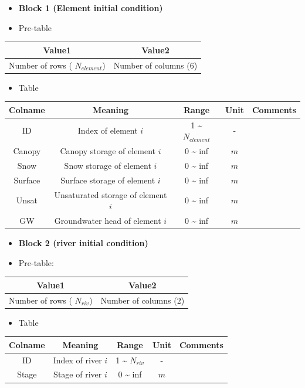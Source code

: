 \documentclass[]{scrbook}
\providecommand{\tightlist}{%
  \setlength{\itemsep}{0pt}\setlength{\parskip}{0pt}}
\begin{document}
\begin{itemize}
\item
  \textbf{Block 1 (Element initial condition)}
\item
  Pre-table
\end{itemize}

\begin{longtable}[]{@{}cc@{}}
\toprule
Value1 & Value2\tabularnewline
\midrule
\endhead
Number of rows ( \(N_{element}\)) & Number of columns
(\(6\))\tabularnewline
\bottomrule
\end{longtable}

\begin{itemize}
\tightlist
\item
  Table
\end{itemize}

\begin{longtable}[]{@{}ccccc@{}}
\toprule
Colname & Meaning & Range & Unit & Comments\tabularnewline
\midrule
\endhead
ID & Index of element \(i\) & 1 \textasciitilde{} \(N_{element}\) & -
&\tabularnewline
Canopy & Canopy storage of element \(i\) & 0 \textasciitilde{} inf &
\(m\) &\tabularnewline
Snow & Snow storage of element \(i\) & 0 \textasciitilde{} inf & \(m\)
&\tabularnewline
Surface & Surface storage of element \(i\) & 0 \textasciitilde{} inf &
\(m\) &\tabularnewline
Unsat & Unsaturated storage of element \(i\) & 0 \textasciitilde{} inf &
\(m\) &\tabularnewline
GW & Groundwater head of element \(i\) & 0 \textasciitilde{} inf & \(m\)
&\tabularnewline
\bottomrule
\end{longtable}

\begin{itemize}
\item
  \textbf{Block 2 (river initial condition)}
\item
  Pre-table:
\end{itemize}

\begin{longtable}[]{@{}cc@{}}
\toprule
Value1 & Value2\tabularnewline
\midrule
\endhead
Number of rows ( \(N_{riv}\)) & Number of columns (\(2\))\tabularnewline
\bottomrule
\end{longtable}

\begin{itemize}
\tightlist
\item
  Table
\end{itemize}

\begin{longtable}[]{@{}ccccc@{}}
\toprule
Colname & Meaning & Range & Unit & Comments\tabularnewline
\midrule
\endhead
ID & Index of river \(i\) & 1 \textasciitilde{} \(N_{riv}\) & -
&\tabularnewline
Stage & Stage of river \(i\) & 0 \textasciitilde{} inf & \(m\)
&\tabularnewline
\bottomrule
\end{longtable}
\end{document}
